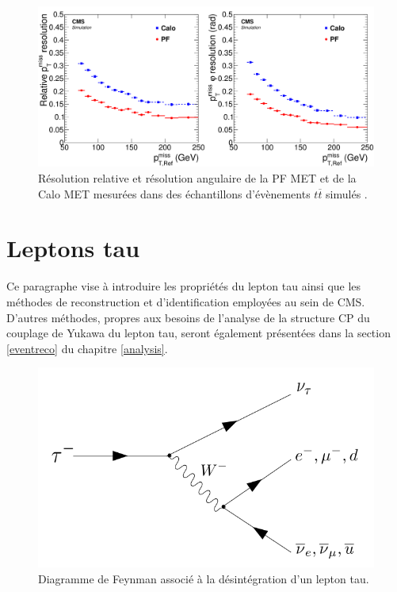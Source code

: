 \begin{figure}
    \centering
    \includegraphics[scale=0.15]{Chapitre4/Images/METres.png}
    \caption{Résolution relative et résolution angulaire de la PF MET et de la Calo MET mesurées dans des échantillons d'évènements $t\overline{t}$ simulés \cite{ThePFAlgo}.}
    \label{METreso}
\end{figure}

\section{Leptons tau}

Ce paragraphe vise à introduire les propriétés du lepton tau ainsi que les méthodes de reconstruction et d'identification employées au sein de CMS. D'autres méthodes, propres aux besoins de l'analyse de la structure CP du couplage de Yukawa du lepton tau, seront également présentées dans la section \ref{eventreco} du chapitre \ref{analysis}.

\begin{figure}[b]
\centering
    \includegraphics[width=0.6\linewidth]{Chapitre4/Images/taudecay.png} 
    \caption{Diagramme de Feynman associé à la désintégration d'un lepton tau.}
    \label{taudecay}
\end{figure} 

